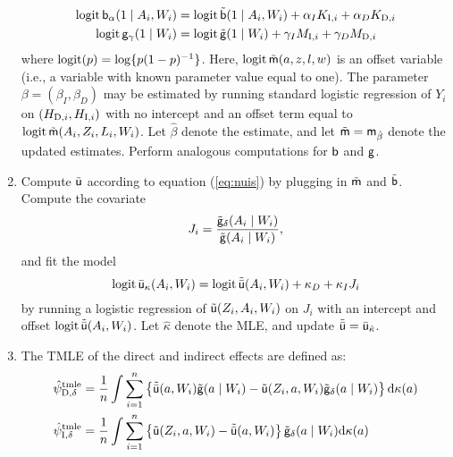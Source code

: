 \begin{enumerate}[label=Step \arabic*., align=left, leftmargin=*]
\begin{align*}
    \operatorname{logit} \mathsf{b}_\alpha(1\mid A_i,W_i) &= \operatorname{logit} \tilde
                                      {\mathsf{b}}(1\mid A_i,W_i) + \alpha_I K_{\mbox{\scriptsize I}, i} +
                                      \alpha_D K_{\mbox{\scriptsize
                                      D}, i}\\
    \operatorname{logit} \mathsf{g}_\gamma(1\mid W_i) &= \operatorname{logit} \tilde
                                  {\mathsf{g}}(1\mid W_i) + \gamma_I M_{\mbox{\scriptsize I}, i} +
                                  \gamma_D M_{\mbox{\scriptsize D}, i}
  \end{align*}
  where
  $\operatorname{logit}(p) = \log\{p(1-p)^{-1}\}$. Here, $\operatorname{logit} \tilde{\mathsf{m}}(a,z,l,w)$
  is an offset variable (i.e., a variable with known parameter value
  equal to one). The parameter $\beta=(\beta_I, \beta_D)$ may be
  estimated by running standard logistic regression of $Y_i$ on
  $(H_{\mbox{\scriptsize D}, i}, H_{\mbox{\scriptsize I}, i})$ with no
  intercept and an offset term equal to
  $\operatorname{logit} \tilde{\mathsf{m}}(A_i,Z_i,L_i,W_i)$. Let $\hat\beta$ denote the
  estimate, and let $\tilde {\mathsf{m}}=\mathsf{m}_{\hat\beta}$ denote the updated
  estimates. Perform analogous computations for $\mathsf{b}$ and $\mathsf{g}$.
\item \label{step:computeu} Compute $\tilde{\mathsf{u}}$ according to equation
  (\ref{eq:nuis}) by plugging in $\tilde{\mathsf{m}}$ and $\tilde{\mathsf{b}}$. Compute
  the covariate
  \[J_i = \frac{{\tilde{\mathsf{g}}}_\delta(A_i
      \mid W_i)}{{\tilde{\mathsf{g}}}(A_i\mid W_i)},\]
  and fit the model
  \[\operatorname{logit} \bar{\mathsf{u}}_\kappa(A_i,W_i) = \operatorname{logit} \tilde{\bar{\mathsf{u}}}(A_i,W_i) +
    \kappa_D + \kappa_I J_{ i}\] by running a logistic regression of
  $\tilde{\mathsf{u}}(Z_i,A_i,W_i)$ on $J_i$ with an intercept and offset
  $\operatorname{logit} \tilde{\bar{\mathsf{u}}}(A_i,W_i)$. Let $\hat\kappa$ denote the MLE,
  and update $\tilde{\bar{\mathsf{u}}} = \bar{\mathsf{u}}_{\hat \kappa}$.
\item The TMLE of the direct and indirect effects are defined as:
  \begin{equation*}
    \begin{split}
      \hat\psi_{\mbox{\scriptsize D}, \delta}^{\mbox{\scriptsize tmle}} &= \frac{1}{n} \int\sum_{i = 1}^n
      \left\{\tilde{\bar{\mathsf{u}}}(a,W_i)\tilde{\mathsf{g}}(a\mid W_i) -
        \tilde{\mathsf{u}}(Z_i,a,W_i)\tilde{\mathsf{g}}_\delta(a\mid W_i)\right\}\mathrm{d}\kappa(a)\\
      \hat\psi_{\mbox{\scriptsize I}, \delta}^{\mbox{\scriptsize tmle}} &= \frac{1}{n} \int\sum_{i = 1}^n
      \left\{\tilde{\mathsf{u}}(Z_i,a,W_i) -
        \tilde{\bar{\mathsf{u}}}(a,W_i)\right\}\tilde{\mathsf{g}}_\delta(a\mid
      W_i)\mathrm{d}\kappa(a)
    \end{split}
  \end{equation*}
\end{enumerate}

